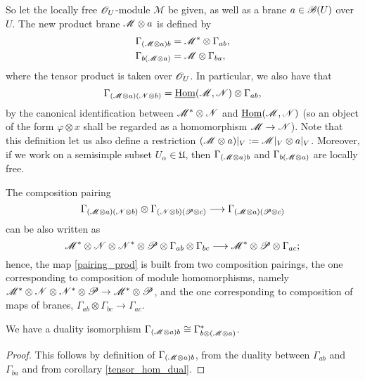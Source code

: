 So let the locally free $\mathscr{O}_U$-module $\mathscr{M}$ be given, as well as a brane $a\in \mathscr{B}(U)$ over $U$. The new product brane $\mathscr{M}\otimes a$ is defined by
\begin{equation}\label{product_brane}
\begin{aligned}
\Gamma_{(\mathscr{M}\otimes a)b} &= \mathscr{M}^*\otimes \Gamma_{ab}, \\
\Gamma_{b(\mathscr{M}\otimes a)} &= \mathscr{M} \otimes \Gamma_{ba}, \\
\end{aligned}
\end{equation}
where the tensor product is taken over $\mathscr{O}_U$. In particular, we also have that
$$\Gamma_{(\mathscr{M}\otimes a)(\mathscr{N}\otimes b)}=\underline{\operatorname{Hom}}(\mathscr{M},\mathscr{N})\otimes \Gamma_{ab},$$
by the canonical identification between $\mathscr{M}^*\otimes \mathscr{N}$ and $\underline{\operatorname{Hom}}(\mathscr{M},\mathscr{N})$ (so an object of the form $\varphi \otimes x$ shall be regarded as a homomorphism $\mathscr{M}\to \mathscr{N}$). Note that this definition let us also define a restriction $(\mathscr{M}\otimes a)|_V:=\mathscr{M}|_V\otimes a|_V$. Moreover, if we work on a semisimple subset $U_\alpha \in \mathfrak{U}$, then $\Gamma_{(\mathscr{M}\otimes a)b}$ and $\Gamma_{b(\mathscr{M}\otimes a)}$ are locally free.

The composition pairing
\begin{equation}\label{pairing_prod}
\Gamma_{(\mathscr{M}\otimes a)(\mathscr{N}\otimes b)}\otimes \Gamma_{(\mathscr{N}\otimes b)(\mathscr{P}\otimes c)}\longrightarrow \Gamma_{(\mathscr{M}\otimes a)(\mathscr{P}\otimes c)}
\end{equation}
can be also written as
$$\mathscr{M}^*\otimes \mathscr{N} \otimes \mathscr{N}^* \otimes \mathscr{P}\otimes \Gamma_{ab}\otimes \Gamma_{bc}\longrightarrow \mathscr{M}^*\otimes \mathscr{P}\otimes \Gamma_{ac};$$
hence, the map \eqref{pairing_prod} is built from two composition pairings, the one corresponding to composition of module homomorphisms, namely $\mathscr{M}^*\otimes \mathscr{N}\otimes \mathscr{N}^*\otimes \mathscr{P}\to \mathscr{M}^*\otimes \mathscr{P}$, and the one corresponding to composition of maps of branes, $\Gamma_{ab}\otimes \Gamma_{bc}\to \Gamma_{ac}$.

\begin{lemma}
We have a duality isomorphism $\Gamma_{(\mathscr{M}\otimes a)b}\cong \Gamma_{b\otimes (\mathscr{M}\otimes a)}^*$.
\end{lemma}
\begin{proof}
This follows by definition of $\Gamma_{(\mathscr{M}\otimes a)b}$, from the duality between $\Gamma_{ab}$ and $\Gamma_{ba}$ and from corollary \ref{tensor_hom_dual}.
\end{proof}

